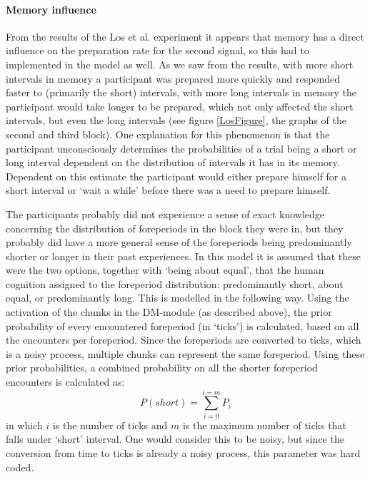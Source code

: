 \documentclass[10pt,letterpaper]{article}
\begin{document}
\paragraph{Memory influence}
From the results of the Los et al. experiment it appears that memory has a direct influence on the preparation rate for the second signal, so this had to implemented in the model as well. As we saw from the results, with more short intervals in memory a participant was prepared more quickly and responded faster to (primarily the short) intervals, with more long intervals in memory the participant would take longer to be prepared, which not only affected the short intervals, but even the long intervals (see figure \ref{LosFigure}, the graphs of the second and third block). One explanation for this phenomenon is that the participant unconsciously determines the probabilities of a trial being a short or long interval dependent on the distribution of intervals it has in its memory. Dependent on this estimate the participant would either prepare himself for a short interval or `wait a while' before there was a need to prepare himself. 

The participants probably did not experience a sense of exact knowledge concerning the distribution of foreperiods in the block they were in, but they probably did have a more general sense of the foreperiods being predominantly shorter or longer in their past experiences. In this model it is assumed that these were the two options, together with `being about equal', that the human cognition assigned to the foreperiod distribution: predominantly short, about equal, or predominantly long.
This is modelled in the following way. Using the activation of the chunks in the DM-module (as described above), the prior probability of every encountered foreperiod (in `ticks') is calculated, based on all the encounters per foreperiod. Since the foreperiods are converted to ticks, which is a noisy process, multiple chunks can represent the same foreperiod. Using these prior probabilities, a combined probability on all the shorter foreperiod encounters is calculated as:
\begin{equation}
	P(short) = \sum_{i = 0}^{i = m} P_i
\end{equation}
in which $i$ is the number of ticks and $m$ is the maximum number of ticks that falls under `short' interval. One would consider this to be noisy, but since the conversion from time to ticks is already a noisy process, this parameter was hard coded.
\end{document}
